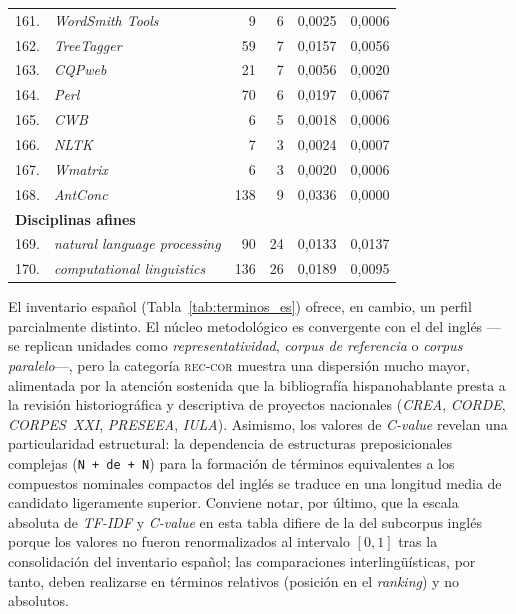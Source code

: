 \begin{longtable}{@{} r p{5cm} r r r r @{}}
161. & \textit{WordSmith Tools} & 9 & 6 & 0{,}0025 & 0{,}0006 \\
162. & \textit{TreeTagger} & 59 & 7 & 0{,}0157 & 0{,}0056 \\
163. & \textit{CQPweb} & 21 & 7 & 0{,}0056 & 0{,}0020 \\
164. & \textit{Perl} & 70 & 6 & 0{,}0197 & 0{,}0067 \\
165. & \textit{CWB} & 6 & 5 & 0{,}0018 & 0{,}0006 \\
166. & \textit{NLTK} & 7 & 3 & 0{,}0024 & 0{,}0007 \\
167. & \textit{Wmatrix} & 6 & 3 & 0{,}0020 & 0{,}0006 \\
168. & \textit{AntConc} & 138 & 9 & 0{,}0336 & 0{,}0000 \\
\midrule
\multicolumn{6}{l}{\textbf{Disciplinas afines}} \\
\midrule
169. & \textit{natural language processing} & 90 & 24 & 0{,}0133 & 0{,}0137 \\
170. & \textit{computational linguistics} & 136 & 26 & 0{,}0189 & 0{,}0095 \\
\end{longtable}
\normalsize

El inventario español (Tabla~\ref{tab:terminos_es}) ofrece, en cambio, un
perfil parcialmente distinto. El núcleo metodológico es convergente con
el del inglés ---se replican unidades como \textit{representatividad},
\textit{corpus de referencia} o \textit{corpus paralelo}---, pero la
categoría \textsc{rec-cor} muestra una dispersión mucho mayor, alimentada
por la atención sostenida que la bibliografía hispanohablante presta a
la revisión historiográfica y descriptiva de proyectos nacionales
(\textit{CREA}, \textit{CORDE}, \textit{CORPES~XXI}, \textit{PRESEEA},
\textit{IULA}). Asimismo, los valores de \textit{C-value} revelan una
particularidad estructural: la dependencia de estructuras preposicionales
complejas (\texttt{N + de + N}) para la formación de términos
equivalentes a los compuestos nominales compactos del inglés se traduce
en una longitud media de candidato ligeramente superior. Conviene notar,
por último, que la escala absoluta de \textit{TF-IDF} y \textit{C-value}
en esta tabla difiere de la del subcorpus inglés porque los valores no
fueron renormalizados al intervalo $[0,1]$ tras la consolidación del
inventario español; las comparaciones interlingüísticas, por tanto, deben
realizarse en términos relativos (posición en el \textit{ranking})
y no absolutos.

